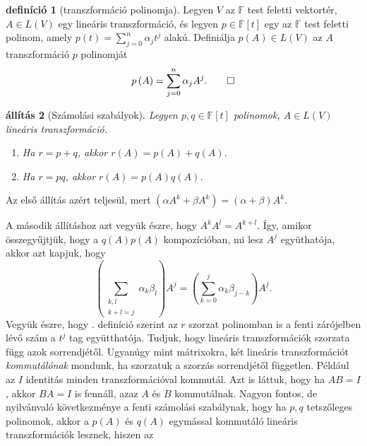 \documentclass[9pt, a4paper, showtrims]{memoir}
\makeatletter
\renewenvironment{proof}[1][\proofname]
    {\par\pushQED{\qed}%
    \normalfont \topsep6\p@\@plus6\p@\relax
    \trivlist
    \item[\hskip\labelsep
        \itshape
    #1\@addpunct{:}]\ignorespaces}
    {\popQED\endtrivlist\@endpefalse}
\theoremstyle{plain}
\newtheorem{proposition}{állítás}[chapter]
\theoremstyle{remark}
\theoremstyle{definition}
\newtheorem{definition}[proposition]{definíció}
\makeatother
\begin{document}
\begin{definition}[transzformáció polinomja]
	Legyen $V$ az $\mathbb{F}$ test feletti vektortér,
	$A\in L\left( V \right)$ egy lineáris transzformáció, és
	legyen $p\in\mathbb{F}\left[t \right]$ egy az $\mathbb{F}$ test feletti
	polinom,
	amely $p\left( t \right)=
		\sum_{j=0}^n\alpha_jt^j$
	alakú.
	Definiálja $p\left( A \right)\in L\left( V \right)$
	az $A$ transzformáció $p$ polinomját
	\[
		p\left( A \right)
		=
		\sum_{j=0}^n\alpha_jA^j.\qedhere
	\]
\end{definition}
\begin{proposition}[Számolási szabályok]
	Legyen $p,q\in\mathbb{F}\left[ t \right]$ polinomok,
	$A\in L\left( V \right)$ lineáris transzformáció.
	\begin{enumerate}
		\item Ha $r=p+q$, akkor $r\left( A \right)=p\left( A \right)+q\left( A \right)$.
		\item Ha $r=pq$, akkor $r\left( A \right)=p\left( A \right)q\left( A \right)$.\qedhere
	\end{enumerate}
\end{proposition}
\begin{proof}
	Az első állítás azért teljesül, mert
	\(
	\left( \alpha A^k+\beta A^k \right)
	=
	\left( \alpha+\beta \right)A^k.
	\)

	A második állításhoz azt vegyük észre, hogy
	\(
	A^kA^l=A^{k+l}.
	\)
	Így, amikor összegyűjtjük, hogy a $q\left( A \right)p\left( A \right)$
	kompozícióban, mi lesz $A^j$ együthatója,
	akkor azt kapjuk,
	hogy
	\begin{displaymath}
		\left( \sum_{\substack{k,l\\k+l=j}}\alpha_k\beta_l \right)A^j
		=
		\left( \sum_{k=0}^j\alpha_k\beta_{j-k} \right)A^j.
	\end{displaymath}
	Vegyük észre, hogy . definíció szerint az
	$r$ szorzat polinomban is a fenti zárójelben lévő szám a
	$t^j$ tag együtthatója.
\end{proof}
Tudjuk, hogy lineáris transzformációk szorzata függ azok sorrendjétől.
Ugyanúgy mint mátrixokra, két lineáris transzformációt \emph{kommutálónak}
mondunk, ha szorzatuk a szorzás sorrendjétől független.
Például az $I$ identitás minden transzformációval kommutál.
Azt is láttuk, hogy ha $AB=I$, akkor $BA=I$ is fennáll, azaz $A$ és $B$ kommutálnak.
Nagyon fontos, de nyilvánvaló következménye a fenti számolási szabálynak,
hogy ha $p,q$ tetszőleges polinomok, akkor a $p\left( A \right)$ és $q\left( A \right)$ egymással kommutáló lineáris transzformációk lesznek, hiszen az
\end{document}
